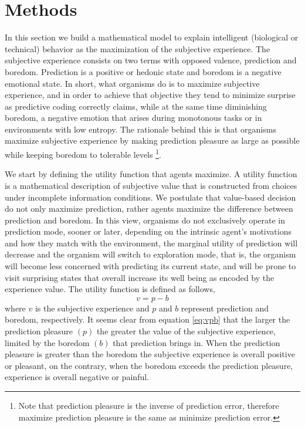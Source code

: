 \documentclass[11pt, onecolumn]{article}
\begin{document}
\section{Methods}
\label{se:methods}

In this section we build a mathematical model to explain intelligent (biological or technical) behavior as the maximization of the subjective experience. 
The subjective experience consists on two terms with opposed valence, prediction and boredom. Prediction is a positive or hedonic state and boredom is a negative emotional state. In short, what organisms do is to maximize subjective experience, and in order to achieve that objective they tend to minimize surprise as predictive coding correctly claims, while at the same time diminishing boredom, a negative emotion that arises during monotonous tasks or in environments with low entropy. The rationale behind this is that organisms maximize subjective experience by making prediction pleasure as large as possible while keeping boredom to tolerable levels \footnote{Note that prediction pleasure is the inverse of prediction error, therefore maximize prediction pleasure is the same as minimize prediction error.}.


We start by defining the utility function that agents maximize. 
A utility function is a mathematical description of subjective value that is constructed from choices under incomplete information conditions. We postulate that value-based decision do not only maximize prediction, rather agents maximize the difference between prediction and boredom. In this view, organisms do not exclusively operate in prediction mode, sooner or later, depending on the intrinsic agent's motivations and how they match with the environment, the marginal utility of prediction will decrease and the organism will switch to exploration mode, that is, the organism will become less concerned with predicting its current state, and  will be prone to visit surprising states that overall increase its well being as encoded by the experience value. 
The utility function is defined as follows,
\begin{equation}
    v =  p - b
\label{eq:vpb}
\end{equation}
where $v$ is the subjective experience and $p$ and $b$ represent prediction and boredom, respectively. 
It seems clear from equation \ref{eq:vpb} that the larger the prediction pleasure $(p)$ the greater the value of the subjective experience, limited by the boredom $(b)$ that prediction brings in.  
When the prediction pleasure is greater than the boredom the subjective experience is overall positive or pleasant, on the contrary, when the boredom exceeds the prediction pleasure, experience is overall negative or painful. 
\end{document}
